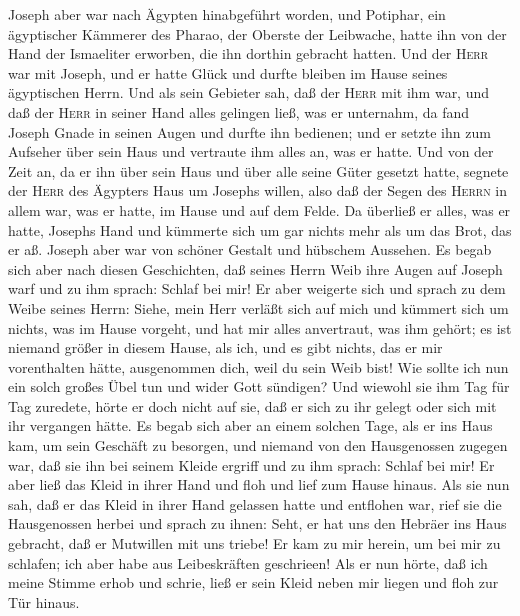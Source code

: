  Joseph aber war nach Ägypten hinabgeführt worden, und
Potiphar, ein ägyptischer Kämmerer des Pharao, der Oberste der
Leibwache, hatte ihn von der Hand der Ismaeliter erworben, die ihn
dorthin gebracht hatten.  Und der \textsc{Herr} war mit
Joseph, und er hatte Glück und durfte bleiben im Hause seines
ägyptischen Herrn.  Und als sein Gebieter sah, daß der
\textsc{Herr} mit ihm war, und daß der \textsc{Herr} in seiner Hand
alles gelingen ließ, was er unternahm,  da fand Joseph
Gnade in seinen Augen und durfte ihn bedienen; und er setzte ihn zum
Aufseher über sein Haus und vertraute ihm alles an, was er hatte.
 Und von der Zeit an, da er ihn über sein Haus und über
alle seine Güter gesetzt hatte, segnete der \textsc{Herr} des Ägypters
Haus um Josephs willen, also daß der Segen des \textsc{Herrn} in allem
war, was er hatte, im Hause und auf dem Felde.  Da
überließ er alles, was er hatte, Josephs Hand und kümmerte sich um gar
nichts mehr als um das Brot, das er aß. Joseph aber war von schöner
Gestalt und hübschem Aussehen.  Es begab sich aber nach
diesen Geschichten, daß seines Herrn Weib ihre Augen auf Joseph warf und
zu ihm sprach: Schlaf bei mir!  Er aber weigerte sich und
sprach zu dem Weibe seines Herrn: Siehe, mein Herr verläßt sich auf mich
und kümmert sich um nichts, was im Hause vorgeht, und hat mir alles
anvertraut, was ihm gehört;  es ist niemand größer in
diesem Hause, als ich, und es gibt nichts, das er mir vorenthalten
hätte, ausgenommen dich, weil du sein Weib bist! Wie sollte ich nun ein
solch großes Übel tun und wider Gott sündigen?  Und
wiewohl sie ihm Tag für Tag zuredete, hörte er doch nicht auf sie, daß
er sich zu ihr gelegt oder sich mit ihr vergangen hätte. 
Es begab sich aber an einem solchen Tage, als er ins Haus kam, um sein
Geschäft zu besorgen, und niemand von den Hausgenossen zugegen war,
 daß sie ihn bei seinem Kleide ergriff und zu ihm sprach:
Schlaf bei mir! Er aber ließ das Kleid in ihrer Hand und floh und lief
zum Hause hinaus.  Als sie nun sah, daß er das Kleid in
ihrer Hand gelassen hatte und entflohen war,  rief sie
die Hausgenossen herbei und sprach zu ihnen: Seht, er hat uns den
Hebräer ins Haus gebracht, daß er Mutwillen mit uns triebe! Er kam zu
mir herein, um bei mir zu schlafen; ich aber habe aus Leibeskräften
geschrieen!  Als er nun hörte, daß ich meine Stimme erhob
und schrie, ließ er sein Kleid neben mir liegen und floh zur Tür hinaus.
